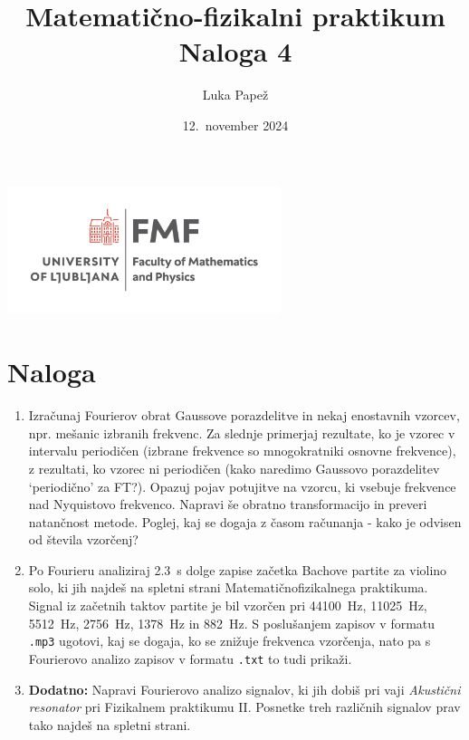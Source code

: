 \documentclass{article}
\begin{document}
\title{Matematično-fizikalni praktikum \\[3mm] \large Naloga 4}
\author{Luka Papež}
\date{12.\ november 2024}

\begin{center}
    \includegraphics[width=8cm]{logo-fmf.png}
\end{center}

{
    \let\newpage\relax
    \maketitle
}

\maketitle
\newpage
\section{Naloga}

\begin{enumerate}
\item Izračunaj Fourierov obrat Gaussove porazdelitve in nekaj enostavnih vzorcev,
npr. mešanic izbranih frekvenc. Za slednje primerjaj rezultate, ko
je vzorec v intervalu periodičen (izbrane frekvence so mnogokratniki
osnovne frekvence), z rezultati, ko vzorec ni periodičen (kako naredimo Gaussovo porazdelitev `periodično' za FT?).
Opazuj pojav potujitve na vzorcu, ki vsebuje frekvence nad Nyquistovo
frekvenco. Napravi še obratno transformacijo in preveri
natančnost metode. Poglej, kaj se dogaja z časom računanja - kako je odvisen od števila vzorčenj?
\item Po Fourieru analiziraj \SI{2.3}{s} dolge zapise začetka Bachove
partite za violino solo, ki jih najdeš na spletni strani
Matematičnofizikalnega praktikuma.  Signal iz začetnih taktov
partite je bil vzorčen pri \SI{44100}{Hz}, \SI{11025}{Hz}, \SI{5512}{Hz}, \SI{2756}{Hz},
\SI{1378}{Hz} in \SI{882}{Hz}.  S poslušanjem zapisov v formatu {\tt .mp3}
ugotovi, kaj se dogaja, ko se znižuje frekvenca vzorčenja,
nato pa s Fourierovo analizo zapisov v formatu {\tt .txt}
to tudi prikaži.
\item \textbf{Dodatno:} Napravi Fourierovo analizo signalov, ki jih dobiš pri vaji
{\sl Akustični resonator\/} pri Fizikalnem praktikumu II.
Posnetke treh različnih signalov prav tako najdeš na spletni strani.
\end{enumerate}
\end{document}
